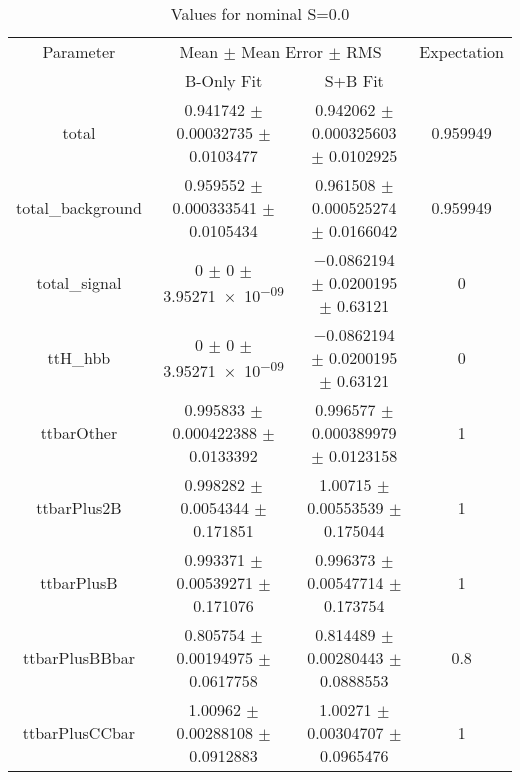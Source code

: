 \begin{table}
\centering
\caption{Values for nominal S=0.0}
\begin{tabular}{cccc}
\toprule
Parameter & \multicolumn{2}{c}{Mean $\pm$ Mean Error $\pm$ RMS} & Expectation\\
 & B-Only Fit & S+B Fit & \\
\midrule
total & \num{0.941742} $\pm$ \num{0.00032735} $\pm$ \num{0.0103477} & \num{0.942062} $\pm$ \num{0.000325603} $\pm$ \num{0.0102925} & \num{0.959949}\\
total\_background & \num{0.959552} $\pm$ \num{0.000333541} $\pm$ \num{0.0105434} & \num{0.961508} $\pm$ \num{0.000525274} $\pm$ \num{0.0166042} & \num{0.959949}\\
total\_signal & \num{0} $\pm$ \num{0} $\pm$ \num{3.95271e-09} & \num{-0.0862194} $\pm$ \num{0.0200195} $\pm$ \num{0.63121} & \num{0}\\
ttH\_hbb & \num{0} $\pm$ \num{0} $\pm$ \num{3.95271e-09} & \num{-0.0862194} $\pm$ \num{0.0200195} $\pm$ \num{0.63121} & \num{0}\\
ttbarOther & \num{0.995833} $\pm$ \num{0.000422388} $\pm$ \num{0.0133392} & \num{0.996577} $\pm$ \num{0.000389979} $\pm$ \num{0.0123158} & \num{1}\\
ttbarPlus2B & \num{0.998282} $\pm$ \num{0.0054344} $\pm$ \num{0.171851} & \num{1.00715} $\pm$ \num{0.00553539} $\pm$ \num{0.175044} & \num{1}\\
ttbarPlusB & \num{0.993371} $\pm$ \num{0.00539271} $\pm$ \num{0.171076} & \num{0.996373} $\pm$ \num{0.00547714} $\pm$ \num{0.173754} & \num{1}\\
ttbarPlusBBbar & \num{0.805754} $\pm$ \num{0.00194975} $\pm$ \num{0.0617758} & \num{0.814489} $\pm$ \num{0.00280443} $\pm$ \num{0.0888553} & \num{0.8}\\
ttbarPlusCCbar & \num{1.00962} $\pm$ \num{0.00288108} $\pm$ \num{0.0912883} & \num{1.00271} $\pm$ \num{0.00304707} $\pm$ \num{0.0965476} & \num{1}\\
\bottomrule
\end{tabular}
\end{table}